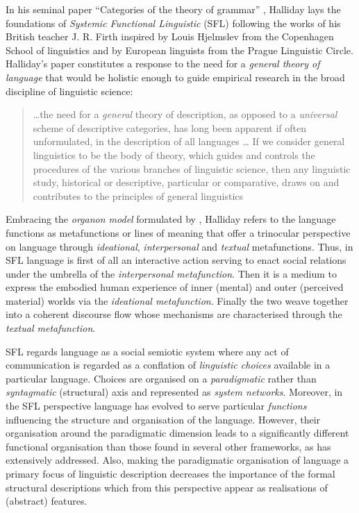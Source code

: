     In his seminal paper ``Categories of the theory of grammar'' \citep{Halliday61}, Halliday lays the foundations of \textit{Systemic Functional Linguistic} (SFL) following the works of his British teacher J. R. Firth inspired by Louis Hjelmslev \citep{Hjelmslev53} from the Copenhagen School of linguistics and by European linguists from the Prague Linguistic Circle. Halliday's paper constitutes a response to the need for a \textit{general theory of language} that would be holistic enough to guide empirical research in the broad discipline of linguistic science:
    \begin{quotation}
        \dots the need for a \textit{general} theory of description, as opposed to a \textit{universal} scheme of descriptive categories, has long been apparent if often unformulated, in the description of all languages \citep[54; emphasis in original]{Halliday57}
        \dots
        If we consider general linguistics to be the body of theory, which guides and controls the procedures of the various branches of linguistic science, then any linguistic study, historical or descriptive, particular or comparative, draws on and contributes to the principles of general linguistics \citep[55]{Halliday57}
    \end{quotation} 
    
    
    Embracing the \textit{organon model} formulated by \citet{Buhler34}, Halliday refers to the language functions as metafunctions or lines of meaning that offer a trinocular perspective on language through \textit{ideational}, \textit{interpersonal} and \textit{textual} metafunctions. Thus, in SFL language is first of all an interactive action serving to enact social relations under the umbrella of the \textit{interpersonal metafunction}. Then it is a medium to express the embodied human experience of inner (mental) and outer (perceived material) worlds via the \textit{ideational metafunction}. Finally the two weave together into a coherent discourse flow whose mechanisms are characterised through the \textit{textual metafunction}. 
    
    SFL regards language as a social semiotic system where any act of communication is regarded as a conflation of \textit{linguistic choices} available in a particular language. Choices are organised on a \textit{paradigmatic} rather than \textit{syntagmatic} (structural) axis and represented as \textit{system networks}. Moreover, in the SFL perspective language has evolved to serve particular \textit{functions} influencing the structure and organisation of the language. However, their organisation around the paradigmatic dimension leads to a significantly different functional organisation than those found in several other frameworks, as \citet{Butler2003-pt1, Butler2003-pt2} has extensively addressed. 
    Also, making the paradigmatic organisation of language a primary focus of linguistic description decreases the importance of the formal structural descriptions which from this perspective appear as realisations of (abstract) features. 
    
